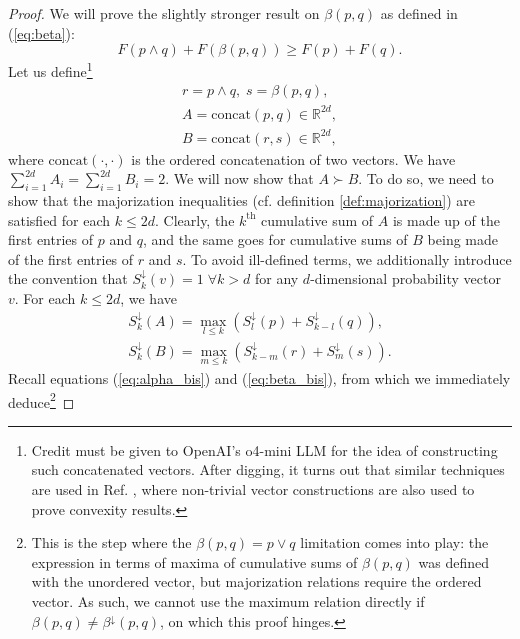 \begin{proof} \label{proof:alternative_supermodularity}
    We will prove the slightly stronger result on $\beta(p, q)$ as defined in (\ref{eq:beta}):
    \begin{equation} \label{eq:beta_supermodularity}
        F(p \wedge q) + F(\beta(p, q)) \geq F(p) + F(q).
    \end{equation}
    Let us define\footnote{Credit must be given to OpenAI's o4-mini LLM for the idea of constructing such concatenated vectors. After digging, it turns out that similar techniques are used in Ref. \cite[pp. 133--136]{marshall_inequalities_2011}, where non-trivial vector constructions are also used to prove convexity results.}
    \begin{gather}
        r = p \wedge q, \; s = \beta(p, q), \\
        A = \text{concat}(p, q) \in \mathbb{R}^{2d}, \\
        B = \text{concat}(r, s) \in \mathbb{R}^{2d},
    \end{gather}
    where $\text{concat}(\cdot, \cdot)$ is the ordered concatenation of two vectors. We have $\sum_{i=1}^{2d} A_i = \sum_{i=1}^{2d} B_i = 2$. We will now show that $A \succ B$. To do so, we need to show that the majorization inequalities (cf. definition \ref{def:majorization}) are satisfied for each $k \leq 2d$. Clearly, the $k^{\text{th}}$ cumulative sum of $A$ is made up of the first entries of $p$ and $q$, and the same goes for cumulative sums of $B$ being made of the first entries of $r$ and $s$. To avoid ill-defined terms, we additionally introduce the convention that $S^\downarrow_k (v) = 1 \; \forall k > d$ for any $d$-dimensional probability vector $v$. For each $k \leq 2d$, we have
    \begin{gather}
        S^\downarrow_k (A) = \max_{l\leq k} \left(S^\downarrow_l (p) + S^\downarrow_{k-l} (q)\right), \\
        S^\downarrow_k (B) = \max_{m\leq k} \left(S^\downarrow_{k-m} (r)+ S^\downarrow_m (s)\right).
    \end{gather} %
    Recall equations (\ref{eq:alpha_bis}) and (\ref{eq:beta_bis}), from which we immediately deduce\footnote{This is the step where the $\beta(p, q) = p \vee q$ limitation comes into play: the expression in terms of maxima of cumulative sums of $\beta(p, q)$ was defined with the unordered vector, but majorization relations require the ordered vector. As such, we cannot use the maximum relation directly if $\beta(p, q) \neq \beta^\downarrow(p, q)$, on which this proof hinges.}

\end{proof}
